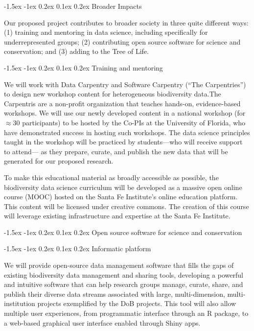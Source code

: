 \documentclass[11pt]{article}
\makeatletter
\renewcommand\section{\@startsection{section}{1}{\z@}%
                                  {-1.5ex \@plus -1ex \@minus 0.2ex}%
                                  {0.1ex \@plus 0.2ex}%
                                  {\normalfont\Large\bfseries}}
\renewcommand\subsection{\@startsection{subsection}{1}{\z@}%
                                  {-1.5ex \@plus -1ex \@minus 0.2ex}%
                                  {0.1ex \@plus 0.2ex}%
                                  {\normalfont\large\bfseries}}
\renewcommand\subsubsection{\@startsection{subsection}{1}{\z@}%
                                  {-1.5ex \@plus -1ex \@minus 0.2ex}%
                                  {0.1ex \@plus 0.2ex}%
                                  {\normalfont\bfseries}}
\makeatother
\begin{document}
\section{Broader Impacts}\label{broader-impacts}

Our proposed project contributes to broader society in three quite
different ways: (1) training and mentoring in data science, including
specifically for underrepresented groups; (2) contributing open source
software for science and conservation; and (3) adding to the Tree of
Life.

\subsection{Training and mentoring}\label{training-and-mentoring}

We will work with Data Carpentry and Software Carpentry (``The
Carpentries'') to design new workshop content for heterogeneous
biodiversity data.The Carpentris are a non-profit organization that
teaches hands-on, evidence-based workshops. We will use our newly
developed content in a national workshop (for $\approx 30$
participants) to be hosted by the Co-PIs at the University of Florida,
who have demonstrated success in hosting such workshops. The data
science principles taught in the workshop will be practiced by
students---who will receive support to attend--- as they prepare,
curate, and publish the new data that will be generated for our
proposed research.

To make this educational material as broadly accessible as possible,
the biodiversity data science curriculum will be developed as a
massive open online course (MOOC) hosted on the Santa Fe Institute's
online education platform. This content will be licensed under
creative commons. The creation of this course will leverage existing
infrastructure and expertise at the Santa Fe Institute.

\subsection{Open source software for science and conservation}\label{open-source-software}

\subsubsection{Informatic platform}\label{informatic-platform}

We will provide open-source data management software that fills the
gaps of existing biodiversity data management and sharing tools,
developing a powerful and intuitive software that can help research
groups manage, curate, share, and publish their diverse data streams
associated with large, multi-dimension, multi-institution projects
exemplified by the DoB projects. This tool will also allow multiple
user experiences, from programmatic interface through an R package, to
a web-based graphical user interface enabled through Shiny apps.
\end{document}
